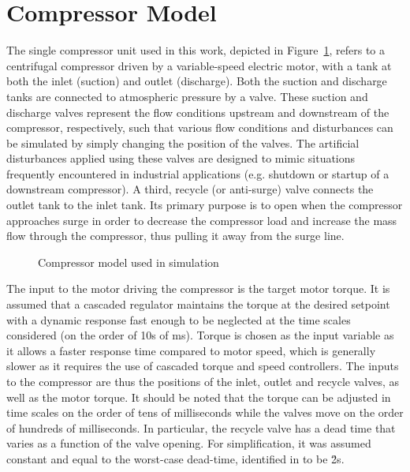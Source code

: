\section{Compressor Model}
\label{sec:mod:comp}

The single compressor unit used in this work, depicted in Figure~\ref{fig:mod:single_comp}, refers to a centrifugal compressor driven by a variable-speed electric motor, with a tank at both the inlet (suction) and outlet (discharge).
Both the suction and discharge tanks are connected to atmospheric pressure by a valve.
These suction and discharge valves represent the flow conditions upstream and downstream of the compressor, respectively, such that various flow conditions and disturbances can be simulated by simply changing the position of the valves.
The artificial disturbances applied using these valves are designed to mimic situations frequently encountered in industrial applications (e.g. shutdown or startup of a downstream compressor).
A third, recycle (or anti-surge) valve connects the outlet tank to the inlet tank. Its primary purpose is to open when the compressor approaches surge in order to decrease the compressor load and increase the mass flow through the compressor, thus pulling it away from the surge line.

\begin{figure}
  \centering
  \resizebox{0.8\linewidth}{!}{%
    \begin{tikzpicture}
      \drawcomp
    \end{tikzpicture}
  }
  \caption{Compressor model used in simulation}
  \label{fig:mod:single_comp}
\end{figure}


The input to the motor driving the compressor is the target motor torque.
It is assumed that a cascaded regulator maintains the torque at the desired setpoint with a dynamic response fast enough to be neglected at the time scales considered (on the order of 10s of ms).
Torque is chosen as the input variable as it allows a faster response time compared to motor speed, which is generally slower as it requires the use of cascaded torque and speed controllers.
The inputs to the compressor are thus the positions of the inlet, outlet and recycle valves, as well as the motor torque.
It should be noted that the torque can be adjusted in time scales on the order of tens of milliseconds while the valves move on the order of hundreds of milliseconds.
In particular, the recycle valve has a dead time that varies as a function of the valve opening. For simplification, it was assumed constant and equal to the worst-case dead-time, identified in \cite{Cortinovis2015} to be \u{2}{s}.


